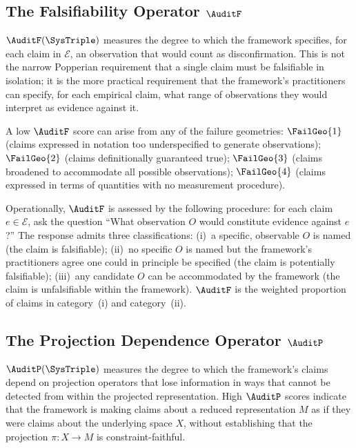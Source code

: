 \subsection{The Falsifiability Operator \texorpdfstring{$\AuditF$}{F}}
\label{subsec:falsifiability}

$\AuditF(\SysTriple)$ measures the degree to which
the framework specifies, for each claim in $\mathcal{E}$,
an observation that would count as disconfirmation.
This is not the narrow Popperian requirement that a
single claim must be falsifiable in isolation; it is
the more practical requirement that the framework's
practitioners can specify, for each empirical claim,
what range of observations they would interpret as
evidence against it.

A low $\AuditF$ score can arise from any of the
failure geometries: $\FailGeo{1}$ (claims expressed
in notation too underspecified to generate observations);
$\FailGeo{2}$ (claims definitionally guaranteed true);
$\FailGeo{3}$ (claims broadened to accommodate all
possible observations); $\FailGeo{4}$ (claims expressed
in terms of quantities with no measurement procedure).

Operationally, $\AuditF$ is assessed by the following
procedure: for each claim $e \in \mathcal{E}$, ask
the question ``What observation $O$ would constitute
evidence against $e$?'' The response admits three
classifications: (i)~a specific, observable $O$ is
named (the claim is falsifiable); (ii)~no specific
$O$ is named but the framework's practitioners agree
one could in principle be specified (the claim is
potentially falsifiable); (iii)~any candidate $O$
can be accommodated by the framework (the claim is
unfalsifiable within the framework). $\AuditF$ is
the weighted proportion of claims in category~(i)
and category~(ii).

\subsection{The Projection Dependence Operator \texorpdfstring{$\AuditP$}{P}}
\label{subsec:projection-dependence}

$\AuditP(\SysTriple)$ measures the degree to which
the framework's claims depend on projection operators
that lose information in ways that cannot be detected
from within the projected representation. High
$\AuditP$ scores indicate that the framework is making
claims about a reduced representation $M$ as if they
were claims about the underlying space $X$, without
establishing that the projection $\pi: X \to M$
is constraint-faithful.

